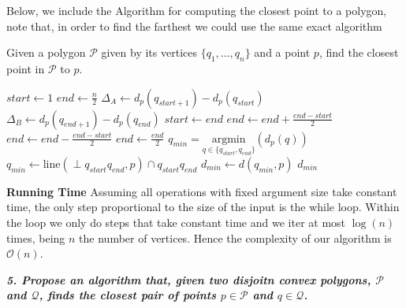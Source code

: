 \documentclass[a4paper, 10pt]{article}
\begin{document}
Below, we include the Algorithm for computing the closest point to a polygon, note that, in order to find the farthest we could use the same exact algorithm
\begin{algorithm}
    \caption{Given a polygon $\mathcal{P}$ given by its vertices $\lbrace q_1, \dots, q_n\rbrace$ and a point $p$, find the closest point in $\mathcal{P}$ to $p$. \label{alg:closest}}
  \begin{multicols}{2}
  \begin{algorithmic}[1]
        \State $start \gets 1$
        \State $end \gets \frac{n}{2}$
            \State $\Delta_A \gets d_p(q_{start + 1}) - d_p(q_{start})$
            \State $\Delta_B \gets d_p(q_{end + 1}) - d_p(q_{end})$
                \Case{$+ +$}
                \EndCase
                \Case{$+ -$}
                    \State $start \gets end$ 
                    \State $end \gets end + \frac{end - start}{2}$
                \EndCase
                \Case{$- +$}
                    \State $end \gets end - \frac{end - start}{2}$
                \EndCase
                \Case{$- -$}
                    \State $end \gets \frac{end}{2}$
                \EndCase
            \EndSwitch
        \EndWhile
            \State $q_{min} = \underset{q \in \lbrace q_{start}, q_{end}\rbrace}{\text{argmin}}{(d_p(q))}$
        \Else
            \State $q_{min} \gets \text{line}(\perp q_{start}q_{end}, p) \cap q_{start}q_{end}$
        \EndIf
        \State $d_{min} \gets d(q_{min}, p)$
        \State \Return $d_{min}$
  \end{algorithmic}
  \end{multicols}
\end{algorithm}

\textbf{Running Time} Assuming all operations with fixed argument size take constant time, the only step proportional to the size of the input is the while loop. Within the loop we only do steps that take constant time and we iter at most $\log(n)$ times, being $n$ the number of vertices. Hence the complexity of our algorithm is $\mathcal{O}(n)$.

\pagebreak 
\textbf{\textit{5. Propose an algorithm that, given two disjoitn convex polygons, $\mathcal{P}$ and $\mathcal{Q}$, finds the closest pair of points $p \in \mathcal{P}$ and $q \in \mathcal{Q}$.}}
\end{document}
